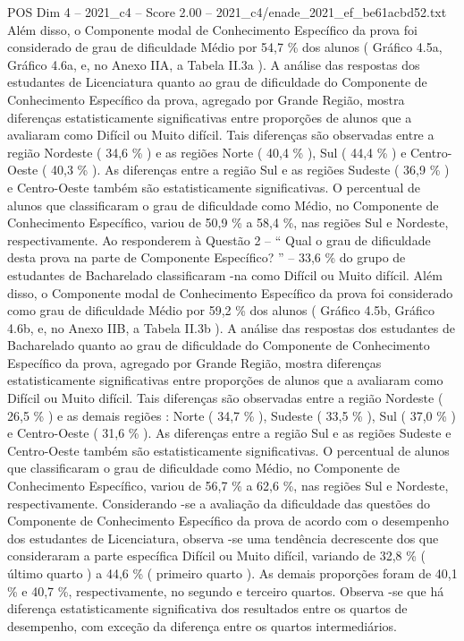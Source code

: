 \begin{textsample}{POS Dim 4 – 2021\_c4 – Score 2.00 – 2021\_c4/enade\_2021\_ef\_be61acbd52.txt}
Além disso, o Componente modal de Conhecimento Específico da prova foi considerado de grau de dificuldade Médio por 54,7 \% dos alunos ( Gráfico 4.5a, Gráfico 4.6a, e, no Anexo IIA, a Tabela II.3a ).
A análise das respostas dos estudantes de Licenciatura quanto ao grau de dificuldade do Componente de Conhecimento Específico da prova, agregado por Grande Região, mostra diferenças estatisticamente significativas entre proporções de alunos que a avaliaram como Difícil ou Muito difícil.
Tais diferenças são observadas entre a região Nordeste ( 34,6 \% ) e as regiões Norte ( 40,4 \% ), Sul ( 44,4 \% ) e Centro-Oeste ( 40,3 \% ).
As diferenças entre a região Sul e as regiões Sudeste ( 36,9 \% ) e Centro-Oeste também são estatisticamente significativas.
O percentual de alunos que classificaram o grau de dificuldade como Médio, no Componente de Conhecimento Específico, variou de 50,9 \% a 58,4 \%, nas regiões Sul e Nordeste, respectivamente.
Ao responderem à Questão 2 – “ Qual o grau de dificuldade desta prova na parte de Componente Específico? ” – 33,6 \% do grupo de estudantes de Bacharelado classificaram -na como Difícil ou Muito difícil.
Além disso, o Componente modal de Conhecimento Específico da prova foi considerado como grau de dificuldade Médio por 59,2 \% dos alunos ( Gráfico 4.5b, Gráfico 4.6b, e, no Anexo IIB, a Tabela II.3b ).
A análise das respostas dos estudantes de Bacharelado quanto ao grau de dificuldade do Componente de Conhecimento Específico da prova, agregado por Grande Região, mostra diferenças estatisticamente significativas entre proporções de alunos que a avaliaram como Difícil ou Muito difícil.
Tais diferenças são observadas entre a região Nordeste ( 26,5 \% ) e as demais regiões : Norte ( 34,7 \% ), Sudeste ( 33,5 \% ), Sul ( 37,0 \% ) e Centro-Oeste ( 31,6 \% ).
As diferenças entre a região Sul e as regiões Sudeste e Centro-Oeste também são estatisticamente significativas.
O percentual de alunos que classificaram o grau de dificuldade como Médio, no Componente de Conhecimento Específico, variou de 56,7 \% a 62,6 \%, nas regiões Sul e Nordeste, respectivamente.
Considerando -se a avaliação da dificuldade das questões do Componente de Conhecimento Específico da prova de acordo com o desempenho dos estudantes de Licenciatura, observa -se uma tendência decrescente dos que consideraram a parte específica Difícil ou Muito difícil, variando de 32,8 \% ( último quarto ) a 44,6 \% ( primeiro quarto ).
As demais proporções foram de 40,1 \% e 40,7 \%, respectivamente, no segundo e terceiro quartos.
Observa -se que há diferença estatisticamente significativa dos resultados entre os quartos de desempenho, com exceção da diferença entre os quartos intermediários.

\end{textsample}

